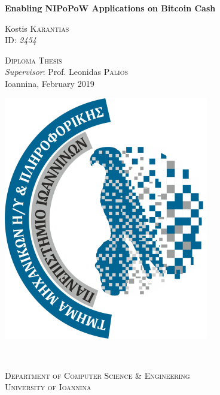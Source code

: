 \begin{titlepage}
  \vspace*{\fill}
  \LARGE \textbf{Enabling NIPoPoW Applications on Bitcoin Cash} \\

  \begin{center}
    \large
    Kostis \textsc{Karantias}\\
    \small ID: \emph{2454}
  \end{center}

  \center \textsc{\Large Diploma Thesis}\\[1cm]

  \large
  \emph{Supervisor}: Prof. Leonidas \textsc{Palios}\\[1cm]

  Ioannina, February 2019
  \vspace*{\fill}

  \begin{minipage}{0.4\textwidth}
    \begin{flushleft} \large
      \includegraphics[scale=1]{cse-uoi-logo}\\
    \end{flushleft}
  \end{minipage}
    ~
  \begin{minipage}{0.5\textwidth}
    \begin{flushright}
      \textsc{\Large Department of Computer Science \& Engineering\\[0.4cm]
      University of Ioannina}
    \end{flushright}
  \end{minipage}\\
\end{titlepage}
